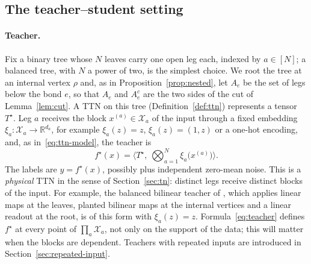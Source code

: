 \documentclass[11pt]{article}
\newcommand{\R}{\mathbb{R}}
\theoremstyle{definition}
\numberwithin{equation}{section}
\begin{document}
\subsection{The teacher--student setting}\label{sec:compare-setting}

\paragraph{Teacher.}
Fix a binary tree whose $N$ leaves carry one open leg each, indexed by $a\in[N]$; a balanced tree, with $N$ a power of two, is the simplest choice. We root the tree at an internal vertex $\rho$ and, as in Proposition~\ref{prop:nested}, let $A_e$ be the set of legs below the bond $e$, so that $A_e$ and $A_e^c$ are the two sides of the cut of Lemma~\ref{lem:cut}. A TTN on this tree (Definition~\ref{def:ttn}) represents a tensor $T^\star$. Leg $a$ receives the block $x^{(a)}\in\mathcal X_a$ of the input through a fixed embedding $\xi_a:\mathcal X_a\to\R^{d_a}$, for example $\xi_a(z)=z$, $\xi_a(z)=(1,z)$ or a one-hot encoding, and, as in~\eqref{eq:ttn-model}, the teacher is
\begin{equation}\label{eq:teacher}
f^\star(x)=\Big\langle T^\star,\ \bigotimes_{a=1}^N\xi_a\big(x^{(a)}\big)\Big\rangle .
\end{equation}
The labels are $y=f^\star(x)$, possibly plus independent zero-mean noise. This is a \emph{physical} TTN in the sense of Section~\ref{sec:tn}: distinct legs receive distinct blocks of the input. For example, the balanced bilinear teacher of \citet[Section~6.2]{hfl_surrogate}, which applies linear maps at the leaves, planted bilinear maps at the internal vertices and a linear readout at the root, is of this form with $\xi_a(z)=z$. Formula~\eqref{eq:teacher} defines $f^\star$ at every point of $\prod_a\mathcal X_a$, not only on the support of the data; this will matter when the blocks are dependent. Teachers with repeated inputs are introduced in Section~\ref{sec:repeated-input}.
\end{document}
